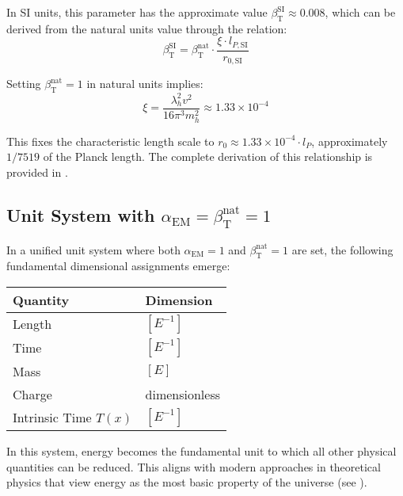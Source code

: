 \documentclass[12pt,a4paper]{article}
\newcommand{\Tfield}{T(x)}
\newcommand{\alphaEM}{\alpha_{\text{EM}}}
\newcommand{\betaT}{\beta_{\text{T}}}
\begin{document}
	In SI units, this parameter has the approximate value \(\betaT^{\text{SI}} \approx 0.008\), which can be derived from the natural units value through the relation:
	\begin{equation}
		\betaT^{\text{SI}} = \betaT^{\text{nat}} \cdot \frac{\xi \cdot l_{P,\text{SI}}}{r_{0,\text{SI}}}
	\end{equation}
	
	Setting \(\betaT^{\text{nat}} = 1\) in natural units implies:
	\begin{equation}
		\xi = \frac{\lambda_h^2 v^2}{16\pi^3 m_h^2} \approx 1.33 \times 10^{-4}
	\end{equation}
	
	This fixes the characteristic length scale to \(r_0 \approx 1.33 \times 10^{-4} \cdot l_P\), approximately \(1/7519\) of the Planck length. The complete derivation of this relationship is provided in \cite{pascher_params_2025}.
	
	\subsection{Unit System with \(\alphaEM = \betaT^{\text{nat}} = 1\)}
	\label{subsec:unified_system}
	
	In a unified unit system where both \(\alphaEM = 1\) and \(\betaT^{\text{nat}} = 1\) are set, the following fundamental dimensional assignments emerge:
	
	\begin{tcolorbox}[colback=blue!5!white,colframe=blue!75!black,title=Dimensional Assignments in the Unified Unit System]
		\begin{tabular}{ll}
			\textbf{Quantity} & \textbf{Dimension} \\
			\hline
			Length & \([E^{-1}]\) \\
			Time & \([E^{-1}]\) \\
			Mass & \([E]\) \\
			Charge & dimensionless \\
			Intrinsic Time \(\Tfield\) & \([E^{-1}]\) \\
		\end{tabular}
	\end{tcolorbox}
	
	In this system, energy becomes the fundamental unit to which all other physical quantities can be reduced. This aligns with modern approaches in theoretical physics that view energy as the most basic property of the universe (see \cite{pascher_zeit_masse_2025}).
	
\end{document}
